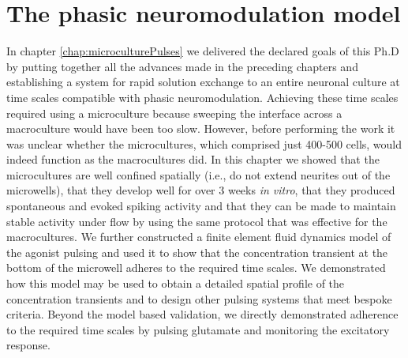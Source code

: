 \section{The phasic neuromodulation model}
In chapter \ref{chap:microculturePulses} we delivered the declared goals of this Ph.D by putting together all the advances made in the preceding chapters and establishing a system for rapid solution exchange to an entire neuronal culture at time scales compatible with phasic neuromodulation. Achieving these time scales required using a microculture because sweeping the interface across a macroculture would have been too slow. However, before performing the work it was unclear whether the microcultures, which comprised just 400-500 cells, would indeed function as the macrocultures did. In this chapter we showed that the microcultures are well confined spatially (i.e., do not extend neurites out of the microwells), that they develop well for over 3 weeks \textit{in vitro}, that they produced spontaneous and evoked spiking activity and that they can be made to maintain stable activity under flow by using the same protocol that was effective for the macrocultures. We further constructed a finite element fluid dynamics model of the agonist pulsing and used it to show that the concentration transient at the bottom of the microwell adheres to the required time scales. We demonstrated how this model may be used to obtain a detailed spatial profile of the concentration transients and to design other pulsing systems that meet bespoke criteria. Beyond the model based validation, we directly demonstrated adherence to the required time scales by pulsing glutamate and monitoring the excitatory response.

